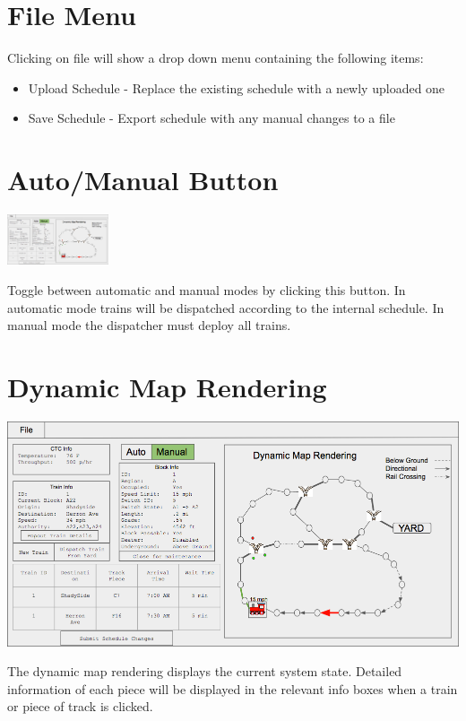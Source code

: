 \documentclass{scrreprt}
\begin{document}
\section{File Menu}
Clicking on file will show a drop down menu containing the following items:
\begin{itemize}
  \item Upload Schedule - Replace the existing schedule with a newly uploaded one
  \item Save Schedule - Export schedule with any manual changes to a file
\end{itemize}

\section{Auto/Manual Button}
\begin{center}
  \includegraphics[trim={9cm 14.65cm 20.8cm 1.7cm},clip,width=3cm]{CTC-main}
\end{center}
Toggle between automatic and manual modes by clicking this button. In automatic mode trains
will be dispatched according to the internal schedule. In manual mode the dispatcher must
deploy all trains.

\section{Dynamic Map Rendering}
\begin{center}
  \includegraphics[trim={17cm .65cm .5cm 1.75cm},clip,width=\textwidth]{CTC-main}
\end{center}
The dynamic map rendering displays the current system state. Detailed information of each
piece will be displayed in the relevant info boxes when a train or piece of track is clicked.
\end{document}
